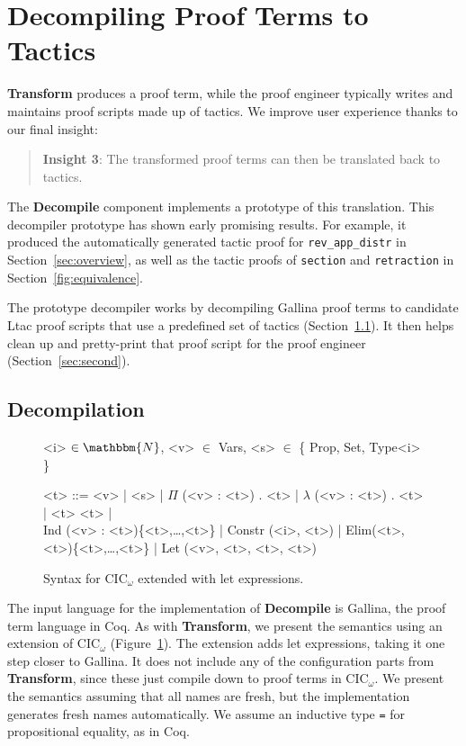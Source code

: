 \section{Decompiling Proof Terms to Tactics}
\label{sec:decompiler}

\textbf{Transform} produces a proof term,
while the proof engineer typically writes and maintains proof scripts made up of tactics.
We improve user experience thanks to our final insight:

\begin{quote}
\textbf{Insight 3}: The transformed proof terms can then be translated back to tactics.
\end{quote}

The \textbf{Decompile} component implements a prototype of this translation.
This decompiler prototype has shown early promising results.
For example, it produced the automatically generated tactic proof for \lstinline{rev_app_distr} 
in Section~\ref{sec:overview}, as well as the tactic proofs of \lstinline{section}
and \lstinline{retraction} in Section~\ref{fig:equivalence}.

The prototype decompiler works by decompiling Gallina proof terms to candidate Ltac proof scripts that 
use a predefined set of tactics (Section~\ref{sec:first}).
It then helps clean up and pretty-print that proof script for the proof engineer (Section~\ref{sec:second}).

\subsection{Decompilation}
\label{sec:first}

\begin{figure}
\small
\begin{grammar}
<i> $\in \mathbbm{N}$, <v> $\in$ Vars, <s> $\in$ \{ Prop, Set, Type<i> \}

<t> ::= <v> | <s> | $\Pi$ (<v> : <t>) . <t> | $\lambda$ (<v> : <t>) . <t> | <t> <t> | \\
Ind (<v> : <t>)\{<t>,\ldots,<t>\} | Constr (<i>, <t>) | Elim(<t>, <t>)\{<t>,\ldots,<t>\} | Let (<v>, <t>, <t>, <t>)
\end{grammar}
\caption{Syntax for CIC$_{\omega}$ extended with let expressions.}
\label{fig:gallinasyntax}
\end{figure}

The input language for the implementation of \textbf{Decompile} is Gallina, the proof term language in Coq.
As with \textbf{Transform}, we present the semantics using an extension of CIC$_{\omega}$ (Figure~\ref{fig:gallinasyntax}).
The extension adds let expressions, taking it one step closer to Gallina.
It does not include any of the configuration parts from \textbf{Transform}, since these just compile down to proof terms in CIC$_{\omega}$.
We present the semantics assuming that all names are fresh, but the implementation generates fresh names automatically.
We assume an inductive type \lstinline{=} for propositional equality, as in Coq.

